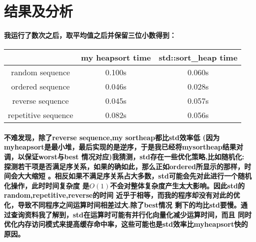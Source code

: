 \documentclass[UTF8]{ctexart}
\begin{document}
\section{结果及分析}
\paragraph{\hspace{2em}我运行了数次之后，取平均值之后并保留三位小数得到：\newline
}

\par

\begin{tabular}{|c|c|c|} 
    \hline  %
     & my heapsort time & std::sort\_heap time \\  %
    \hline  %
    random sequence & 0.100s & 0.060s \\  %
    \hline
    ordered sequence & 0.046s & 0.028s \\  %
    \hline  %
    reverse sequence & 0.045s & 0.057s \\
    \hline
    repetitive sequence & 0.082s & 0.056s \\
    \hline
\end{tabular}


\par

\paragraph{\hspace{2em}不难发现，除了reverse sequence,my sortheap都比std效率低
(因为myheapsort是最小堆，最后实现的是逆序，于是我已经将mysortheap结果对调，以保证worst与best
情况对应)我猜测，std存在一些优化策略,比如随机化:
探测若干项是否满足序关系，如果的确如此，那么正如ordered所显示的那样，时间会大大缩短
。相反如果不满足序关系占大多数，std可能会先对此进行一个随机化操作，此时时间复杂度
是$O(1)$不会对整体复杂度产生太大影响。因此std的random,repetitive,reverse的时间
近乎于相等，而我的程序却没有对此的优化，导致不同程序之间运算时间相差过大.除了best情况
剩下的均比std要慢。通过查询资料我了解到，std在运算时可能有并行化向量化减少运算时间，而且
同时优化内存访问模式来提高缓存命中率，这些可能也是std效率比myheapsort快的原因。}
\end{document}

